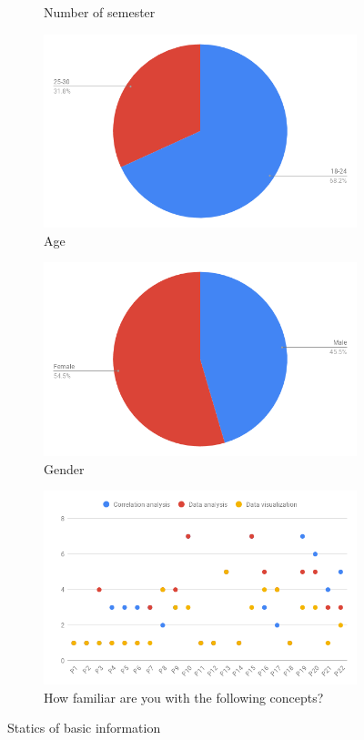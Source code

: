 \begin{figure}[h]
\begin{subfigure}[b]{0.48\textwidth}
		\caption{Number of semester}
	\end{subfigure}
	\hfill
	\begin{subfigure}[b]{0.48\textwidth}
		\centering
		\includegraphics[width=\textwidth]{pictures/q13}
		\caption{Age}
	\end{subfigure}
	\begin{subfigure}[b]{0.48\textwidth}
	\centering
	\includegraphics[width=\textwidth]{pictures/q14}
	\caption{Gender}
\end{subfigure}
	\begin{subfigure}[b]{\textwidth}
	\centering
	\includegraphics[width=\textwidth]{pictures/q15}
	\caption{How familiar are you with the following concepts?}
\end{subfigure}
	\caption{Statics of basic information}
	\label{fig:statics1}
\end{figure}

